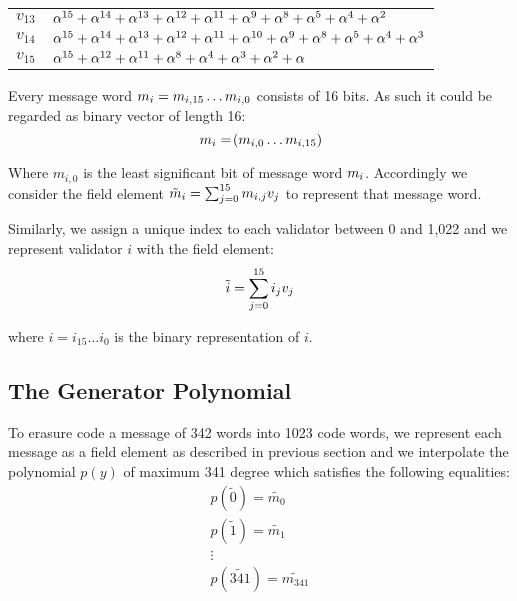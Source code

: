 \begin{center}
\begin{tabular}{ll}
    $v_{13}$ & $\alpha^{15} + \alpha^{14} + \alpha^{13} + \alpha^{12} +
    \alpha^{11} + \alpha^9 + \alpha^8 + \alpha^5 + \alpha^4 + \alpha^2$\\
    $v_{14}$ & $\alpha^{15} + \alpha^{14} + \alpha^{13} + \alpha^{12} +
    \alpha^{11} + \alpha^{10} + \alpha^9 + \alpha^8 + \alpha^5 + \alpha^4 +
    \alpha^3$\\
    $v_{15}$ & $\alpha^{15} + \alpha^{12} + \alpha^{11} + \alpha^8 + \alpha^4
    + \alpha^3 + \alpha^2 + \alpha$\\
    \hline
  \end{tabular}
\end{center}

Every message word $m_{i}=m_{i, 15} \ldots m_{i, 0}$ consists of 16 bits. As such it could be regarded as binary vector of length 16:
\begin{equation}
m\sub{i} = \tup{m\sub{i, 0} \ldots m\sub{i, 15}}
\end{equation}

Where $m_{i, 0}$ is the least significant bit of message word $m_{i}$. Accordingly we consider the field element $\tilde{m}_{i} = \sum^{15}_{j = 0} m_{i, j} v_{j}$ to represent that message word.

Similarly, we assign a unique index to each validator between 0 and 1,022 and we represent validator $i$ with the field element:
\begin{equation}
\tilde{i} = \sum^{15}_{j = 0} i_{j} v_{j}
\end{equation}

where $i = i_{15} \ldots i_0$ is the binary representation of $i$.

\subsection{The Generator Polynomial}

To erasure code a message of 342 words into 1023 code words, we represent each message as a field element as described in previous section and we interpolate the polynomial $p(y)$ of maximum 341 degree which satisfies the following equalities:
\begin{equation}
   \begin{array}{l}
     p (\tilde{0}) = \widetilde{m_0}\\
     p (\tilde{1}) = \widetilde{m_1}\\
     \vdots\\
     p (\widetilde{341}) = \widetilde{m_{341}}
   \end{array}
\end{equation}

